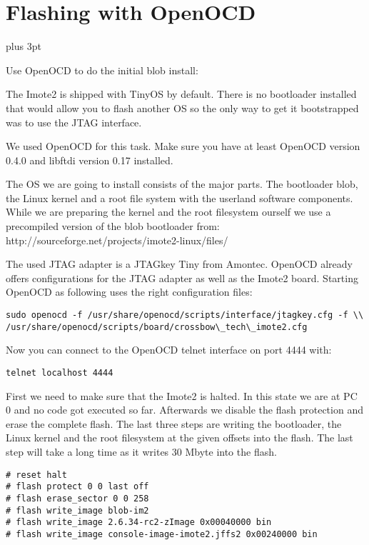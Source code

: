 \chapter{Flashing with OpenOCD}
\label{annexopenocd}
\parindent=0pt                   %
\parskip=6pt plus 3pt            %

Use OpenOCD to do the initial blob install:

The Imote2 is shipped with TinyOS by default. There is no bootloader installed
that would allow you to flash another OS so the only way to get it bootstrapped
was to use the JTAG interface.

We used OpenOCD for this task. Make sure you have at least OpenOCD version 0.4.0
and libftdi version 0.17 installed.

The OS we are going to install consists of the major parts. The bootloader blob, the
Linux kernel and a root file system with the userland software components. While
we are preparing the kernel and the root filesystem ourself we use a
precompiled version of the blob bootloader from:
http://sourceforge.net/projects/imote2-linux/files/

The used JTAG adapter is a JTAGkey Tiny from Amontec. OpenOCD already offers
configurations for the JTAG adapter as well as the Imote2 board. Starting
OpenOCD as following uses the right configuration files:

\begin{verbatim}
sudo openocd -f /usr/share/openocd/scripts/interface/jtagkey.cfg -f \\
/usr/share/openocd/scripts/board/crossbow\_tech\_imote2.cfg
\end{verbatim}

Now you can connect to the OpenOCD telnet interface on port 4444 with:

\begin{verbatim}
telnet localhost 4444
\end{verbatim}

First we need to make sure that the Imote2 is halted. In this state we are at PC
0 and no code got executed so far. Afterwards we disable the flash protection and
erase the complete flash. The last three steps are writing the bootloader, the
Linux kernel and the root filesystem at the given offsets into the flash. The last
step will take a long time as it writes 30 Mbyte into the flash.

\begin{verbatim}
# reset halt
# flash protect 0 0 last off
# flash erase_sector 0 0 258
# flash write_image blob-im2
# flash write_image 2.6.34-rc2-zImage 0x00040000 bin
# flash write_image console-image-imote2.jffs2 0x00240000 bin
\end{verbatim}
